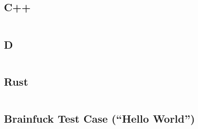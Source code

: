 \documentclass[finalcopy]{srpaper}
\begin{document}
\subsection{C++}
\begin{mdframed}[linecolor=black]
\inputminted[fontsize=\scriptsize]{cpp}{../examples/brainfsck/brainfsck.cpp}
\end{mdframed}

\subsection{D}
\begin{mdframed}[linecolor=black]
\inputminted[fontsize=\scriptsize]{d}{../examples/brainfsck/brainfsck.d}
\end{mdframed}

\subsection{Rust}
\begin{mdframed}[linecolor=black]
\inputminted[fontsize=\scriptsize]{rust}{../examples/brainfsck/brainfsck.rs}
\end{mdframed}

\subsection{Brainfuck Test Case (``Hello World'')}
\begin{mdframed}[linecolor=black]
\inputminted[fontsize=\scriptsize]{brainfuck}{../examples/brainfsck/tests/hello.bf}
\end{mdframed}
\end{document}
